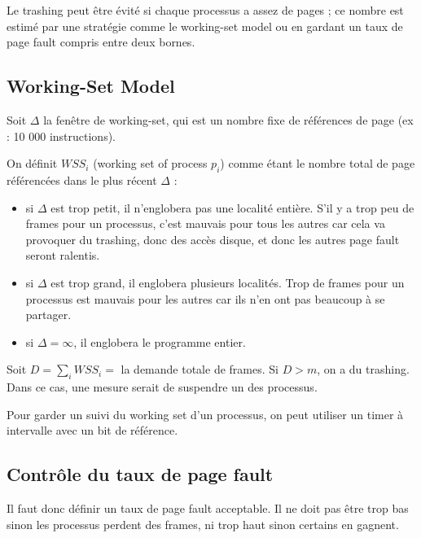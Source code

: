 	Le trashing peut être évité si chaque processus a assez de pages ; ce nombre est estimé par une stratégie comme le working-set model ou en gardant un taux de page fault compris entre deux bornes.
	
	\subsection{Working-Set Model}
	
	Soit $\Delta$ la fenêtre de working-set, qui est un nombre fixe de références de page (ex : 10 000 instructions).
	
	On définit $WSS_i$ (working set of process $p_i$) comme étant le nombre total de page référencées dans le plus récent $\Delta$ :
	
	\begin{itemize}
		\item si $\Delta$ est trop petit, il n'englobera pas une localité entière. S'il y a trop peu de frames pour un processus, c'est mauvais pour tous les autres car cela va provoquer du trashing, donc des accès disque, et donc les autres page fault seront ralentis.
		\item si $\Delta$ est trop grand, il englobera plusieurs localités. Trop de frames pour un processus est mauvais pour les autres car ils n'en ont pas beaucoup à se partager.
		\item si $\Delta = \infty$, il englobera le programme entier.
	\end{itemize}
	
	Soit $D = \sum_i WSS_i =$ la demande totale de frames. Si $D > m$, on a du trashing. Dans ce cas, une mesure serait de suspendre un des processus.
	
	
	Pour garder un suivi du working set d'un processus, on peut utiliser un timer à intervalle avec un bit de référence.
	
	
	
	
	
	\subsection{Contrôle du taux de page fault}
	
	Il faut donc définir un taux de page fault acceptable. Il ne doit pas être trop bas sinon les processus perdent des frames, ni trop haut sinon certains en gagnent.
	
	
